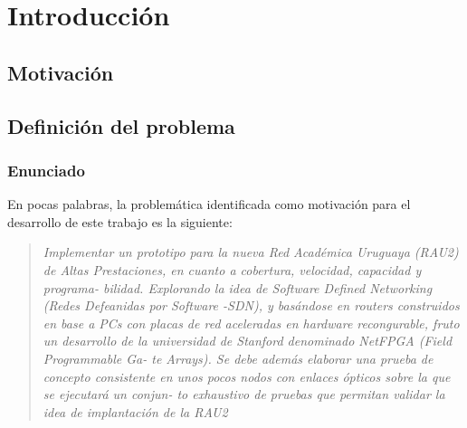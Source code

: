 
\chapter{Introducci\'on}

\ifpdf
    \graphicspath{{Chapter1/Figs/Raster/}{Chapter1/Figs/PDF/}{Chapter2/Figs/}}
\else
    \graphicspath{{Chapter1/Figs/Vector/}{Chapter1/Figs/}}
\fi


\section[Motivaci\'on]{Motivaci\'on}



\section[Definici\'on del problema]{Definici\'on del problema}

\subsection[Enunciado]{Enunciado}


En pocas palabras, la problem\'atica identificada como motivaci\'on para el desarrollo de este trabajo es la siguiente:

\begin{quote}
\textit{Implementar un prototipo para la nueva Red Académica Uruguaya (RAU2) de
Altas Prestaciones, en cuanto a cobertura, velocidad, capacidad y programa-
bilidad. Explorando la idea de Software Defined Networking (Redes Defeanidas
por Software -SDN), y basándose en routers construidos en base a PCs con
placas de red aceleradas en hardware recongurable, fruto un desarrollo de
la universidad de Stanford denominado NetFPGA (Field Programmable Ga-
te Arrays). Se debe además elaborar una prueba de concepto consistente en
unos pocos nodos con enlaces ópticos sobre la que se ejecutará un conjun-
to exhaustivo de pruebas que permitan validar la idea de implantación de la
RAU2}
\end{quote}

